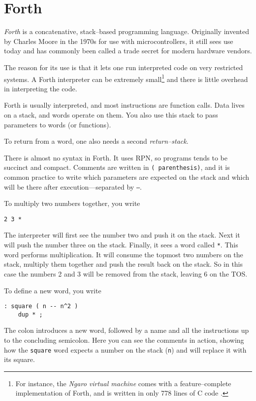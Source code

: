 \section{Forth}

\textit{Forth} is a concatenative, stack--based programming language.
Originally invented by Charles Moore in the 1970s for use with
microcontrollers, it still sees use today and has commonly been called a
trade secret for modern hardware vendors.

The reason for its use is that it lets one run interpreted code on very
restricted systems. A Forth interpreter can be extremely small\footnote{For
instance, the \textit{Ngaro virtual machine} comes with a feature--complete
implementation of Forth, and is written in only 778 lines of C code
\cite{ngaro.vm.core}.}
and there is little overhead in interpreting the code.

Forth is usually interpreted, and most instructions are function calls.
Data lives on a stack, and words operate on them.  You also use this stack
to pass parameters to words (or functions).

To return from a word, one also needs a second \textit{return--stack}.

There is almost no syntax in Forth.  It uses \ac{RPN}, so programs tends to
be succinct and compact.  Comments are written in \texttt{( parenthesis)},
and it is common practice to write which parameters are expected on the
stack and which will be there after execution---separated by \texttt{--}.

To multiply two numbers together, you write

\begin{verbatim}
2 3 *
\end{verbatim}

The interpreter will first see the number two and push it on the stack. Next
it will push the number three on the stack. Finally, it sees a word called
\texttt{*}.  This word performs multiplication. It will consume the topmost
two numbers on the stack, multiply them together and push the result back on
the stack. So in this case the numbers 2 and 3 will be removed from the
stack, leaving 6 on the \ac{TOS}.

To define a new word, you write

\begin{verbatim}
: square ( n -- n^2 )
    dup * ;
\end{verbatim}

The colon introduces a new word, followed by a name and all the instructions
up to the concluding semicolon.  Here you can see the comments in action,
showing how the \texttt{square} word expects a number on the stack
(\texttt{n}) and will replace it with its square.

